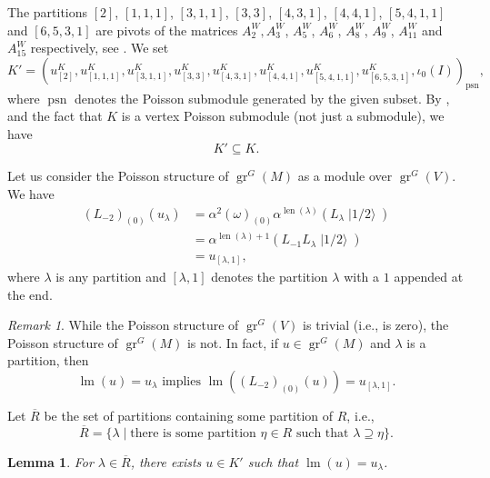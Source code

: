 \documentclass[a4paper, 12pt, reqno]{amsart}
\newtheorem{lemma}[theorem]{Lemma}
\theoremstyle{remark}
\newtheorem{remark}[theorem]{Remark}
\numberwithin{equation}{subsection}
\DeclareMathOperator{\gr}{gr}
\DeclareMathOperator{\lm}{lm}
\DeclareMathOperator{\len}{len}
\DeclareMathOperator{\psn}{psn}
\DeclareMathOperator{\vachalf}{|1/2\rangle}
\begin{document}
The partitions $[2]$, $[1, 1, 1]$, $[3, 1, 1]$, $[3, 3]$, $[4, 3, 1]$, $[4, 4, 1]$, $[5, 4, 1, 1]$ and $[6, 5, 3, 1]$ are pivots of the matrices $A^W_2, A^W_3$, $A^W_5$, $A^W_6$, $A^W_8$, $A^W_9$, $A^W_{11}$ and $A^W_{15}$ respectively, see \cite[ising-modules.ipynb]{sagemath2}.
We set
\begin{equation*}
  K' = (u^K_{[2]}, u^K_{[1, 1, 1]}, u^K_{[3, 1, 1]}, u^K_{[3, 3]}, u^K_{[4, 3, 1]}, u^K_{[4, 4, 1]}, u^K_{[5, 4, 1, 1]}, u^K_{[6, 5, 3, 1]}, \iota_0(I))_{\psn},
\end{equation*}
where $\psn$ denotes the Poisson submodule generated by the given subset.
By ,  and the fact that $K$ is a vertex Poisson submodule (not just a submodule), we have
\begin{equation*}
K' \subseteq K.
\end{equation*}

Let us consider the Poisson structure of $\gr^G(M)$ as a module over $\gr^G(V)$.
We have
\begin{align*}
  (L_{-2})_{(0)}(u_{\lambda}) &= \alpha^2(\omega)_{(0)}\alpha^{\len(\lambda)}(L_{\lambda}\vachalf) \\
  &= \alpha^{\len(\lambda) + 1}(L_{-1}L_{\lambda}\vachalf) \\
  &= u_{[\lambda, 1]},
\end{align*}
where $\lambda$ is any partition and $[\lambda, 1]$ denotes the partition $\lambda$ with a $1$ appended at the end.

\begin{remark}
  \label{rmk:45}
  While the Poisson structure of $\gr^G(V)$ is trivial (i.e., is zero), the Poisson structure of $\gr^G(M)$ is not.
  In fact, if $u \in \gr^G(M)$ and $\lambda$ is a partition, then
  \begin{equation*}
    \lm(u) = u_{\lambda}\text{ implies }\lm((L_{-2})_{(0)}(u)) = u_{[\lambda, 1]}.
  \end{equation*}
\end{remark}

Let $\overline{R}$ be the set of partitions containing some partition of $R$, i.e.,
\begin{equation*}
  \overline{R} = \{\lambda \mid \text{there is some partition }\eta \in R\text{ such that }\lambda \supseteq \eta\}.
\end{equation*}

\begin{lemma}
  \label{lmm:34}
  For $\lambda \in \overline{R}$, there exists $u \in K'$ such that $\lm(u) = u_{\lambda}$.
\end{lemma}
\end{document}
